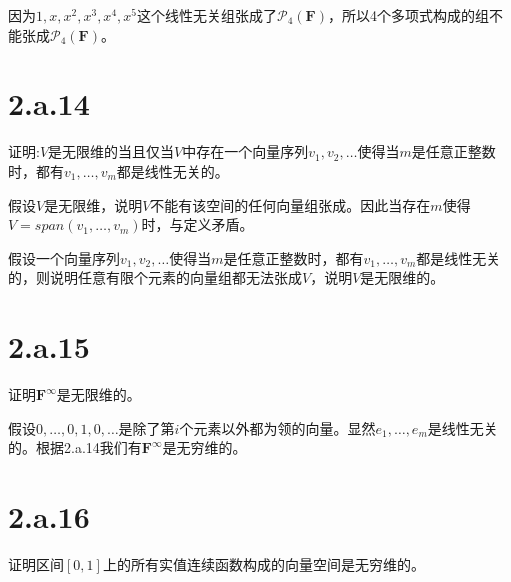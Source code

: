 \documentclass[10pt,a4paper,UTF8]{article}
\begin{document}
\begin{answer}
因为\(1,x,x^{2},x^{3},x^{4},x^{5}\)这个线性无关组张成了\(\mathcal{P}_{4}(\mathbf{F})\)，所以4个多项式构成的组不能张成\(\mathcal{P}_{4}(\mathbf{F})\)。
\end{answer}
\section*{2.a.14}
\label{sec:orgf8e0bc5}


\begin{problem}
证明:\(V\)是无限维的当且仅当\(V\)中存在一个向量序列\(v_{1},v_{2},\ldots\)使得当\(m\)是任意正整数时，都有\(v_{1},\ldots ,v_{m}\)都是线性无关的。
\end{problem}

\begin{answer}
假设\(V\)是无限维，说明\(V\)不能有该空间的任何向量组张成。因此当存在\(m\)使得\(V=span(v_{1},\ldots ,v_{m})\)时，与定义矛盾。

假设一个向量序列\(v_{1},v_{2},\ldots\)使得当\(m\)是任意正整数时，都有\(v_{1},\ldots ,v_{m}\)都是线性无关的，则说明任意有限个元素的向量组都无法张成\(V\)，说明\(V\)是无限维的。
\end{answer}

\section*{2.a.15}
\label{sec:org34db71e}


\begin{problem}
证明\(\mathbf{F}^{\infty}\)是无限维的。
\end{problem}

\begin{answer}
假设\(0,\ldots ,0,1,0,\ldots\)是除了第\(i\)个元素以外都为领的向量。显然\(e_{1},\ldots ,e_{m}\)是线性无关的。根据2.a.14我们有\(\mathbf{F}^{\infty}\)是无穷维的。
\end{answer}

\section*{2.a.16}
\label{sec:org81605fa}


\begin{problem}
证明区间\([0,1]\)上的所有实值连续函数构成的向量空间是无穷维的。
\end{problem}
\end{document}
